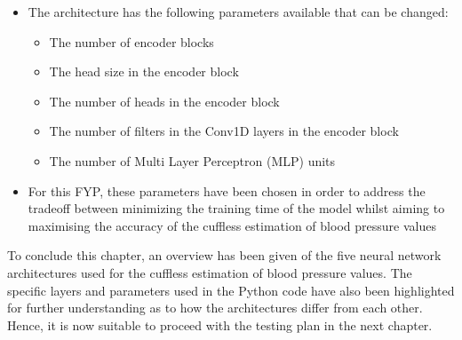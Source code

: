 \begin{itemize}
    \item The architecture has the following parameters available that can be changed:
    \begin{itemize}
        \item The number of encoder blocks
        \item The head size in the encoder block
        \item The number of heads in the encoder block
        \item The number of filters in the Conv1D layers in the encoder block
        \item The number of Multi Layer Perceptron (MLP) units
    \end{itemize}
    \item For this FYP, these parameters have been chosen in order to address the tradeoff between minimizing the training time of the model whilst aiming to maximising the accuracy of the cuffless estimation of blood pressure values
\end{itemize}\noindent To conclude this chapter, an overview has been given of the five neural network architectures used for the cuffless estimation of blood pressure values. The specific layers and parameters used in the Python code have 
also been highlighted for further understanding as to how the architectures differ from each other. Hence, it is now suitable to proceed with the testing plan in the next chapter.